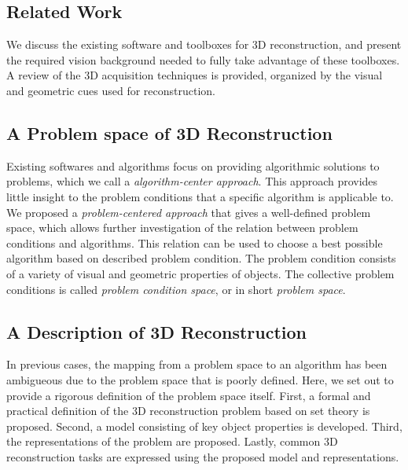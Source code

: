 \subsection{Related Work}
We discuss the existing software and toolboxes for 3D reconstruction, and present the required vision background needed to fully take advantage of these toolboxes. A review of the 3D acquisition techniques is provided, organized by the visual and geometric cues used for reconstruction.

\subsection{A Problem space of 3D Reconstruction}
Existing softwares and algorithms focus on providing algorithmic solutions to problems, which we call a \textit{algorithm-center approach}. This approach provides little insight to the problem conditions that a specific algorithm is applicable to. We proposed a \textit{problem-centered approach} that gives a well-defined problem space, which allows further investigation of the relation between problem conditions and algorithms. This relation can be used to choose a best possible algorithm based on described problem condition. The problem condition consists of a variety of visual and geometric properties of objects. The collective problem conditions is called \textit{problem condition space}, or in short \textit{problem space}.

\subsection{A Description of 3D Reconstruction}
In previous cases, the mapping from a problem space to an algorithm has been ambigueous due to the problem space that is poorly defined. Here, we set out to provide a rigorous definition of the problem space itself. First, a formal and practical definition of the 3D reconstruction problem based on set theory is proposed. Second, a model consisting of key object properties is developed. Third, the representations of the problem are proposed. Lastly, common 3D reconstruction tasks are expressed using the proposed model and representations.


